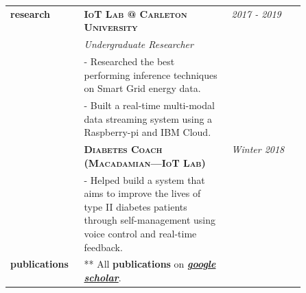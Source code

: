 \documentclass{article}
\begin{document}
\begin{longtable}{@{}>{\raggedleft}p{0.25\linewidth}
                          p{}>{}p{0.25\linewidth}@{}}
        \textbf{research}
            & \textbf{\textsc{IoT Lab @ Carleton University}} & \textit{2017 - 2019} \\
            & \textit{Undergraduate Researcher} \\
            & - Researched the best performing inference techniques on Smart Grid energy data. \\
            & - Built a real-time multi-modal data streaming system using a Raspberry-pi and IBM Cloud. \\ [2em]

            & \textbf{\textsc{Diabetes Coach (Macadamian---IoT Lab)}} & \textit{Winter 2018} \\
            & - Helped build a system that aims to improve the lives of type II diabetes patients through self-management using voice control and real-time feedback. \\ [2em]

        \textbf{publications}
            & ** All \textbf{publications} on \textit{\href{https://scholar.google.ca/citations?user=zFDREhgAAAAJ\&hl=en}{\textbf{google scholar}}}.\\ [1em]

  \end{longtable}
\end{document}
